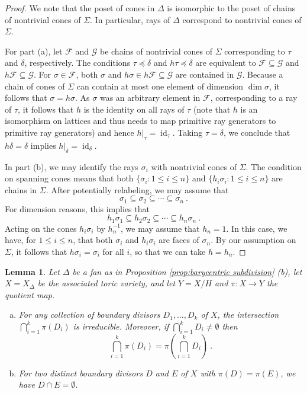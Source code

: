 \documentclass[11pt, a4paper]{amsart}
\newtheorem{lemma}[theorem]{Lemma}
\theoremstyle{definition}
\theoremstyle{myitemstyle}
\newcommand{\mc}[1]{{\mathcal{#1}}}
\DeclareMathOperator{\id}{id}
\begin{document}
\begin{proof}
We note that the poset of cones in $\Delta$ is isomorphic to the poset of chains of nontrivial cones of $\Sigma$. In particular, rays of $\Delta$ correspond to nontrivial cones of $\Sigma$.

For part (a), let $\mc F$ and $\mc G$ be chains of nontrivial cones of $\Sigma$ corresponding to $\tau$ and $\delta$, respectively. The conditions $\tau\preceq \delta$ and $h\tau\preceq\delta$ are equivalent to $\mc F\subseteq \mc G$ and $h\mc F\subseteq \mc G$. For $\sigma\in \mc F$, both $\sigma$ and $h\sigma\in h\mc F\subseteq \mc G$ are contained in $\mc G$. Because a chain of cones of $\Sigma$ can contain at most one element of dimension $\dim\sigma$, it follows that $\sigma=h\sigma$. As $\sigma$ was an arbitrary element in $\mc F$, corresponding to a ray of $\tau$, it follows that $h$ is the identity on all rays of $\tau$ (note that $h$ is an isomorphism on lattices and thus needs to map primitive ray generators to primitive ray generators) and hence $h|_\tau=\id_\tau$. Taking $\tau=\delta$, we conclude that $h\delta=\delta$ implies $h|_\delta=\id_\delta$.

In part (b), we may identify the rays $\sigma_i$ with nontrivial cones of $\Sigma$. The condition on spanning cones means that both $\{\sigma_i:1\leq i\leq n\}$ and $\{h_i\sigma_i:1\leq i\leq n\}$ are chains in $\Sigma$. After potentially relabeling, we may assume that 
\[
    \sigma_1\subseteq \sigma_2\subseteq \cdots \subseteq \sigma_n \ .
\]
For dimension reasons, this implies that
\[
    h_1\sigma_1\subseteq h_2\sigma_2\subseteq \cdots\subseteq h_n\sigma_n\ .
\]
Acting on the cones $h_i\sigma_i$ by $h_n^{-1}$, we may assume that $h_n=1$. In this case, we have, for $1\leq i\leq n$, that both $\sigma_i$ and $h_i\sigma_i$ are faces of $\sigma_n$. By our assumption on $\Sigma$, it follows that $h\sigma_i=\sigma_i$ for all $i$, so that we can take $h=h_n$.
\end{proof}

\begin{lemma}
\label{lem:boundary structure of quotient}
Let $\Delta$ be a fan as in Proposition \ref{prop:barycentric subdivision} (b), let $X=X_\Delta$ be the associated toric variety, and let $Y=X/H$ and $\pi\colon X\to Y$ the quotient map.  
\begin{enumerate} [(a)]
    \item For any collection of boundary divisors $D_1,\ldots, D_k$ of  $X$, 
    the intersection $\bigcap_{i=1}^k \pi(D_i)$ is irreducible. Moreover, if $\bigcap_{i=1}^k D_i\neq \emptyset$  then 
    \[
        \bigcap_{i=1}^k \pi(D_i)=\pi\left(\bigcap_{i=1}^k D_i\right)\ .
    \]
    \item For two distinct boundary divisors $D$ and $E$ of $X$ with $\pi(D)=\pi(E)$, we have $D\cap E=\emptyset$.
\end{enumerate}
\end{lemma}
\end{document}
